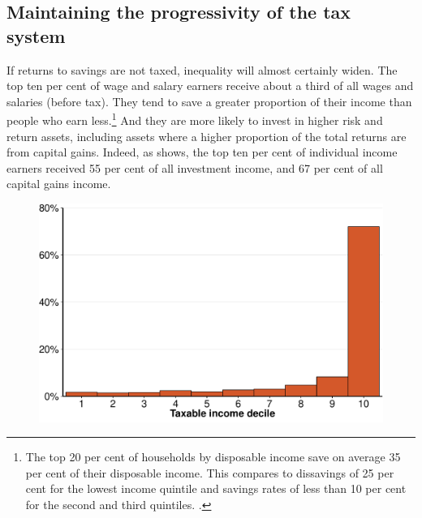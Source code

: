 \subsection{Maintaining the progressivity of the tax system}\label{subsec:maintaining-progressivity-tax-system}
If returns to savings are not taxed, inequality will almost certainly widen. The top ten per cent of wage and salary earners receive about a third of all wages and salaries (before tax). They tend to save a greater proportion of their income than people who earn less.\footnote{The top 20 per cent of households by disposable income save on average 35 per cent of their disposable income. This compares to dissavings of 25 per cent for the lowest income quintile and savings rates of less than 10 per cent for the second and third quintiles. \textcite[][table~5]{ABS2014DistributionHouseholdIncome}.} And they are more likely to invest in higher risk and return assets, including assets where a higher proportion of the total returns are from capital gains. Indeed, as  shows, the top ten per cent of individual income earners received 55 per cent of all investment income, and 67 per cent of all capital gains income. 

\begin{figure}[!ht]
\label{fig:CG-by-decile}

\includegraphics[width=\columnwidth]{CGT-NG-atlas//CG-by-decile-1}
\end{figure}

